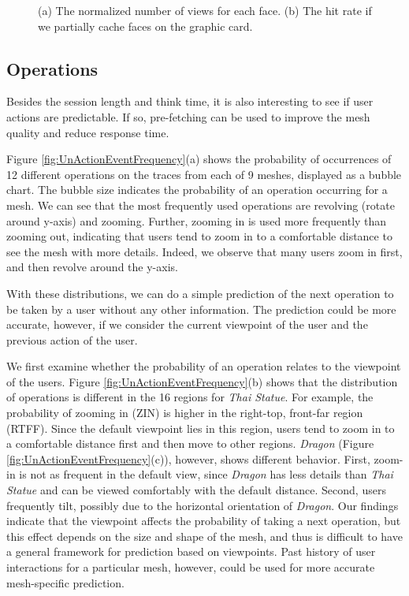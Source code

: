 \begin{figure}[htp!]
\begin{center}
\caption{(a) The normalized number of views for each face. (b) The hit rate if we partially cache faces on the graphic card.\label{fig:heat_map}}
\end{center}
\end{figure}

\subsection{Operations}
Besides the session length and think time, 
it is also interesting to see if user actions are predictable. 
If so, pre-fetching can be used to improve the mesh quality and reduce response time.  

Figure \ref{fig:UnActionEventFrequency}(a) shows the probability of occurrences of 12 different operations on the traces from each of 9 meshes,
displayed as a bubble chart. The bubble size indicates the probability of an operation occurring for a mesh.
We can see that the most frequently used operations are revolving (rotate around y-axis) and zooming.  
Further, zooming in is used more frequently than zooming out, 
indicating that users tend to zoom in to a comfortable distance to see the mesh with more details.  
Indeed, we observe that many users zoom in first, 
and then revolve around the y-axis.  %

With these distributions, we can do a simple prediction of the next operation to be taken 
by a user without any other information.  
The prediction could be more accurate, however, if we consider 
the current viewpoint of the user and the previous action of the user.

We first examine whether the probability of an operation relates to
the viewpoint of the users.  Figure
\ref{fig:UnActionEventFrequency}(b) shows that the distribution of
operations is different in the 16 regions for \textit{Thai Statue}.
For example, the probability of zooming in (ZIN)
is higher in the right-top, front-far region (RTFF).  Since
the default viewpoint lies in this region, users tend to zoom in to a
comfortable distance first and then move to other regions.  
\textit{Dragon} (Figure
\ref{fig:UnActionEventFrequency}(c)), however, shows different
behavior.  First, zoom-in is not as frequent in the
default view, since \textit{Dragon} has less details than \textit{Thai
Statue} and can be viewed comfortably with the default distance.
Second, users frequently tilt, possibly due to 
the horizontal orientation of \textit{Dragon}.  Our
findings indicate that the viewpoint affects the probability of taking a next operation, 
but this effect depends on the size and shape of the mesh,
and thus is difficult to have a general framework for prediction based
on viewpoints.  
Past history of user interactions for a particular mesh, 
however, could be used for more accurate mesh-specific prediction.

